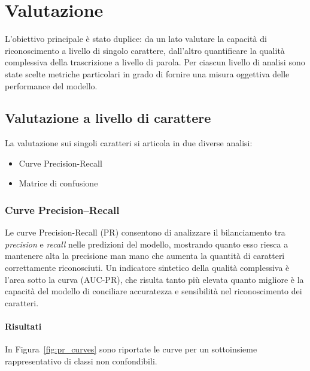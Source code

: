 \chapter{Valutazione}
L'obiettivo principale è stato duplice: da un lato valutare la capacità di riconoscimento a livello di singolo carattere, dall'altro quantificare la qualità complessiva della trascrizione a livello di parola. Per ciascun livello di analisi sono state scelte metriche particolari in grado di fornire una misura oggettiva delle performance del modello.

\section{Valutazione a livello di carattere}
\label{sec:valutazione-caratteri}
La valutazione sui singoli caratteri si articola in due diverse analisi:
\begin{itemize}
    \item Curve Precision-Recall
    \item Matrice di confusione
\end{itemize}

\subsection{Curve Precision–Recall}
Le curve Precision-Recall (PR) consentono di analizzare il bilanciamento tra \emph{precision} e \emph{recall} nelle predizioni del modello, mostrando quanto esso riesca a mantenere alta la precisione man mano che aumenta la quantità di caratteri correttamente riconosciuti. Un indicatore sintetico della qualità complessiva è l'area sotto la curva (AUC-PR), che risulta tanto più elevata quanto migliore è la capacità del modello di conciliare accuratezza e sensibilità nel riconoscimento dei caratteri.

\subsubsection{Risultati}
In Figura~\ref{fig:pr_curves} sono riportate le curve per un sottoinsieme rappresentativo di classi non confondibili.

